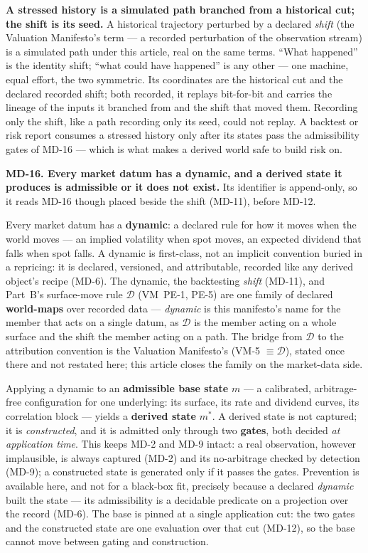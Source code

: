 \documentclass[11pt,a4paper]{article}
\newcommand{\mlabel}[1]{\leavevmode\hypertarget{md-#1}{}%
  \marginpar{\raggedright\scriptsize\ttfamily\textcolor{gray}{#1}}}
\newcommand{\trace}[1]{\par\smallskip{\small\itshape (#1)}}
\begin{document}
\textbf{A stressed history is a simulated path branched from a historical cut;
the shift is its seed.} A historical trajectory perturbed by a declared
\emph{shift} (the Valuation Manifesto's term --- a recorded perturbation of the
observation stream) is a simulated path under this article, real on the same
terms. ``What happened'' is the identity shift; ``what could have happened'' is
any other --- one machine, equal effort, the two symmetric. Its coordinates are
the historical cut and the declared recorded shift; both recorded, it replays
bit-for-bit and carries the lineage of the inputs it branched from and the shift
that moved them. Recording only the shift, like a path recording only its seed,
could not replay. A backtest or risk report consumes a stressed history only after
its states pass the admissibility gates of MD-16 --- which is what makes a derived
world safe to build risk on.
\trace{Simulability, Reproducibility; C-2.8, C-10.1.}

\mlabel{MD-16}\textbf{MD-16. Every market datum has a dynamic, and a derived
state it produces is admissible or it does not exist.} Its identifier is
append-only, so it reads MD-16 though placed beside the shift (MD-11), before MD-12.

Every market datum has a \textbf{dynamic}: a declared rule for how it moves when
the world moves --- an implied volatility when spot moves, an expected dividend
that falls when spot falls. A dynamic is first-class, not an implicit convention
buried in a repricing: it is declared, versioned, and attributable, recorded like
any derived object's recipe (MD-6). The dynamic, the backtesting \emph{shift}
(MD-11), and Part~B's surface-move rule $\mathcal{D}$ (VM~PE-1, PE-5) are one
family of declared \textbf{world-maps} over recorded data --- \emph{dynamic} is this manifesto's
name for the member that acts on a single datum, as $\mathcal{D}$ is the member
acting on a whole surface and the shift the member acting on a path. The bridge
from $\mathcal{D}$ to the attribution convention is the Valuation Manifesto's
(VM-5 $\equiv \mathcal{D}$), stated once there and not restated here; this article
closes the family on the market-data side.

Applying a dynamic to an \textbf{admissible base state} $m$ --- a calibrated,
arbitrage-free configuration for one underlying: its surface, its rate and
dividend curves, its correlation block --- yields a \textbf{derived state}
$m^\ast$. A derived state is not captured; it is \emph{constructed}, and it is
admitted only through two \textbf{gates}, both decided \emph{at application time}.
This keeps MD-2 and MD-9 intact: a real observation, however implausible, is always
captured (MD-2) and its no-arbitrage checked by detection (MD-9); a constructed
state is generated only if it passes the gates. Prevention is available here, and
not for a black-box fit, precisely because a declared \emph{dynamic} built the state
--- its admissibility is a decidable predicate on a projection over the record
(MD-6). The base is pinned at a single application cut: the two gates and the
constructed state are one evaluation over that cut (MD-12), so the base cannot move
between gating and construction.
\end{document}
